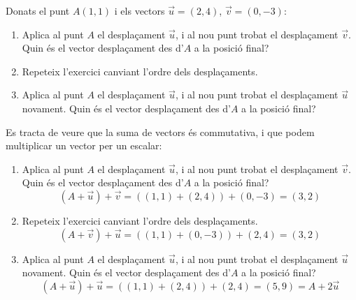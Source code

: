 \Exercise  
Donats el punt $A(1,1)$ i els vectors $\vec{u}=(2,4)$, $\vec{v}=(0,-3)$:
\begin{enumerate}
  \item Aplica al punt $A$ el desplaçament $\vec{u}$, i al nou punt trobat el desplaçament $\vec{v}$. Quin és el vector desplaçament des d'$A$ a la posició final?
  \item Repeteix l'exercici canviant l'ordre dels desplaçaments.
  \item Aplica al punt $A$ el desplaçament $\vec{u}$, i al nou punt trobat el desplaçament $\vec{u}$ novament. Quin és el vector desplaçament des d'$A$ a la posició final?
\end{enumerate}

\Answer

Es tracta de veure que la suma de vectors és commutativa, i que podem multiplicar un vector per un escalar:
\begin{enumerate}
  \item Aplica al punt $A$ el desplaçament $\vec{u}$, i al nou punt trobat el desplaçament $\vec{v}$. Quin és el vector desplaçament des d'$A$ a la posició final?
  \[(A+\vec{u})+\vec{v}=\left((1,1)+(2,4)\right)+(0,-3)=(3,2)\]
  \item Repeteix l'exercici canviant l'ordre dels desplaçaments.
  \[(A+\vec{v})+\vec{u}=\left((1,1)+(0,-3)\right)+(2,4)=(3,2)\]
  \item Aplica al punt $A$ el desplaçament $\vec{u}$, i al nou punt trobat el desplaçament $\vec{u}$ novament. Quin és el vector desplaçament des d'$A$ a la posició final?
  \[(A+\vec{u})+\vec{u}=\left((1,1)+(2,4)\right)+(2,4)=(5,9)=A+2\vec{u}\]
\end{enumerate}
\blacksquare 